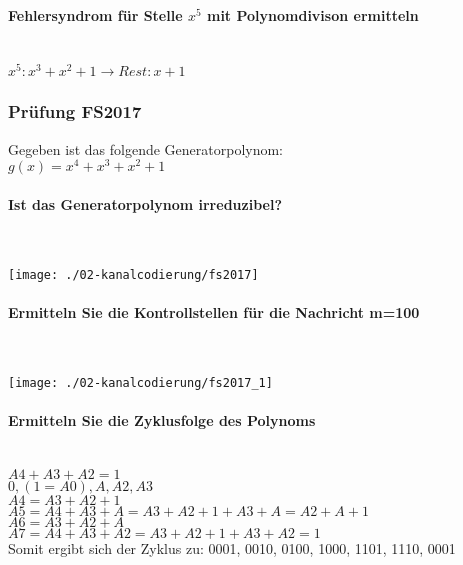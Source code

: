 \paragraph{Fehlersyndrom für Stelle $x^5$ mit Polynomdivison ermitteln}\mbox{}\\
$x^5:x^3+x^2+1 \rightarrow Rest: x+1$

\subsubsection{Prüfung FS2017}
Gegeben ist das folgende Generatorpolynom:\\
$g(x)=x^4+x^3+x^2+1$

\paragraph{Ist das Generatorpolynom irreduzibel?}\mbox{}\\
\begin{center}
    \vspace{-8pt}
    \texttt{[image: ./02-kanalcodierung/fs2017]}
    \vspace{-8pt}
\end{center}

\paragraph{Ermitteln Sie die Kontrollstellen für die Nachricht m=100}\mbox{}\\
\begin{center}
    \vspace{-8pt}
    \texttt{[image: ./02-kanalcodierung/fs2017\_1]}
    \vspace{-8pt}
\end{center}

\paragraph{Ermitteln Sie die Zyklusfolge des Polynoms}\mbox{}\\
$A4+A3+A2=1$\\
$0,(1=A0),A,A2,A3$\\

$A4=A3+A2+1$\\

$A5 = A4 + A3 + A = A3 + A2 + 1 +  A3 + A =  A2 + A + 1$\\
$A6= A3 + A2 + A$\\
$A7= A4 + A3 + A2 = A3 + A2 + 1 + A3 + A2 = 1$\\
Somit ergibt sich der Zyklus zu: 0001, 0010, 0100, 1000, 1101, 1110, 0001

